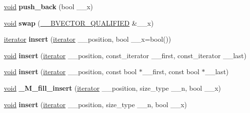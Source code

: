 \begin{DoxyCompactItemize}
\item 
\mbox{\label{class_____b_v_e_c_t_o_r___q_u_a_l_i_f_i_e_d_a92b34f22375df1a3d81d7a2d801ca087}} 
\hyperlink{interfacevoid}{void} {\bfseries push\+\_\+back} (bool \+\_\+\+\_\+x)
\item 
\mbox{\label{class_____b_v_e_c_t_o_r___q_u_a_l_i_f_i_e_d_a625504f41f8f93af54d676e6e97df2c8}} 
\hyperlink{interfacevoid}{void} {\bfseries swap} (\hyperlink{class_____b_v_e_c_t_o_r___q_u_a_l_i_f_i_e_d}{\+\_\+\+\_\+\+B\+V\+E\+C\+T\+O\+R\+\_\+\+Q\+U\+A\+L\+I\+F\+I\+ED} \&\+\_\+\+\_\+x)
\item 
\mbox{\label{class_____b_v_e_c_t_o_r___q_u_a_l_i_f_i_e_d_afd139dc588c1d578d2c4624084732bbf}} 
\hyperlink{structiterator}{iterator} {\bfseries insert} (\hyperlink{structiterator}{iterator} \+\_\+\+\_\+position, bool \+\_\+\+\_\+x=bool())
\item 
\mbox{\label{class_____b_v_e_c_t_o_r___q_u_a_l_i_f_i_e_d_a6ae2e156a5f0441b7b758597eae331bf}} 
\hyperlink{interfacevoid}{void} {\bfseries insert} (\hyperlink{structiterator}{iterator} \+\_\+\+\_\+position, const\+\_\+iterator \+\_\+\+\_\+first, const\+\_\+iterator \+\_\+\+\_\+last)
\item 
\mbox{\label{class_____b_v_e_c_t_o_r___q_u_a_l_i_f_i_e_d_ad50776b56d39c9e8c701438427d75955}} 
\hyperlink{interfacevoid}{void} {\bfseries insert} (\hyperlink{structiterator}{iterator} \+\_\+\+\_\+position, const bool $\ast$\+\_\+\+\_\+first, const bool $\ast$\+\_\+\+\_\+last)
\item 
\mbox{\label{class_____b_v_e_c_t_o_r___q_u_a_l_i_f_i_e_d_a055f10e9991e1d71b366b244b55c76a6}} 
\hyperlink{interfacevoid}{void} {\bfseries \+\_\+\+M\+\_\+fill\+\_\+insert} (\hyperlink{structiterator}{iterator} \+\_\+\+\_\+position, size\+\_\+type \+\_\+\+\_\+n, bool \+\_\+\+\_\+x)
\item 
\mbox{\label{class_____b_v_e_c_t_o_r___q_u_a_l_i_f_i_e_d_a02dbf1993ebb6b8fe419ad9537a067d8}} 
\hyperlink{interfacevoid}{void} {\bfseries insert} (\hyperlink{structiterator}{iterator} \+\_\+\+\_\+position, size\+\_\+type \+\_\+\+\_\+n, bool \+\_\+\+\_\+x)

\end{DoxyCompactItemize}
